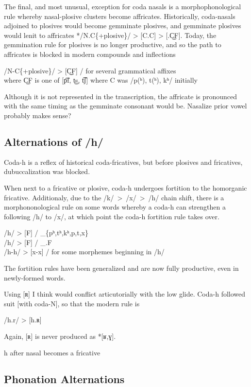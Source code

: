 \documentclass[12pt]{book} %
\begin{document}
The final, and most unusual, exception for coda nasals is a morphophonological rule whereby nasal-plosive clusters become affricates.
Historically, coda-nasals adjoined to plosives would become gemminate plosives, and gemminate plosives would lenit to affricates */N.C\{+plosive\}/ > [C.C] > [.C͜F].
Today, the gemmination rule for plosives is no longer productive, and so the path to affricates is blocked in modern compounds and inflections
\begin{center}
    /N-C\{+plosive\}/ > [C͜F] / for several grammatical affixes \\
    where C͜F is one of [p͡f, t͜s, t͡ʃ] where C was /p(ʰ), t(ʰ), kʰ/ initially
\end{center}
Although it is not represented in the transcription, the affricate is pronounced with the same timing as the gemminate consonant would be.
{\color{red}Nasalize prior vowel probably makes sense?}

\subsection{Alternations of /h/ }

Coda-h is a reflex of historical coda-fricatives, but before plosives and fricatives, dubuccalization was blocked.

When next to a fricative or plosive, coda-h undergoes fortition to the homorganic fricative.
Additionaly, due to the /k/~>~/x/~>~/h/ chain shift, there is a morphononological rule on some words whereby a coda-h can strengthen a following /h/ to /x/, at which point the coda-h fortition rule takes over.
\begin{center}
    /h/ > [F] / \_\{pʰ,tʰ,kʰ,p,t,x\} \\
    /h/ > [F] / \_.F \\
    /h-h/ > [x-x] / for some morphemes beginning in /h/
\end{center}
The fortition rules have been generalized and are now fully productive, even in newly-formed words.


{\color{red}
{\color{green} Using [ʀ] I think would conflict articutorially with the low glide.}
Coda-h followed suit [with coda-N], so that the modern rule is
\begin{center}
    /h.r/ > [h.ʀ]
\end{center}
Again, [ʀ] is never produced as *[ʁ,ɣ].
}

{\color{cyan}
h after nasal becomes a fricative
}

\subsection{Phonation Alternations}
\end{document}
